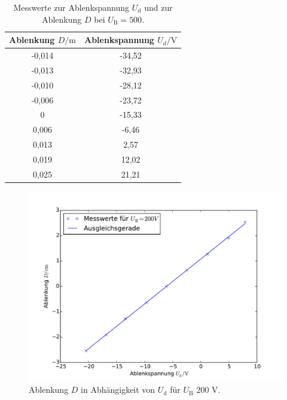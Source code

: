 \begin{table}
  \caption{Messwerte zur Ablenkspannung $U_\mathrm{d}$ und zur Ablenkung $D$ bei $U_\mathrm{B}=500$.}
  \centering
  \label{tab:messwerte5}
  \begin{tabular}{c c }
    \toprule
    Ablenkung $D/\si{\meter}$ &    Ablenkspannung $U_d/\si{\volt}$\\
    \midrule
-0,014 &-34,52 \\
-0,013 & -32,93 \\
-0,010 & -28,12 \\
-0,006 & -23,72 \\
0 & -15,33 \\
0,006 & -6,46 \\
0,013 & 2,57\\
0,019 & 12,02 \\
0,025 & 21,21 \\
    \bottomrule
    \end{tabular}
\end{table}

\begin{figure}
  \centering
  \includegraphics[scale=0.8]{auswertung/501-a1.pdf}
\caption{Ablenkung $D$ in Abhängigkeit von $U_\mathrm{d}$ für $U_\mathrm{B}$ 200 \si{\volt}.}
  \label{fig:empfindlichkeit1}
\end{figure}

